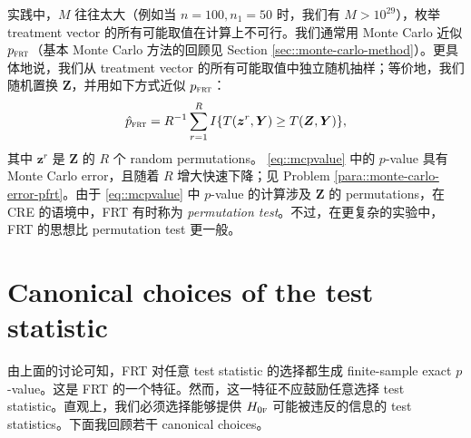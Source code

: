 实践中，$M$ 往往太大（例如当 $n=100, n_1=50$ 时，我们有 $M > 10^{29}$），枚举 treatment vector 的所有可能取值在计算上不可行。我们通常用 Monte Carlo 近似 $p_{\textsc{frt}}$（基本 Monte Carlo 方法的回顾见 Section \ref{sec::monte-carlo-method}）。更具体地说，我们从 treatment vector 的所有可能取值中独立随机抽样；等价地，我们随机置换 $\boldsymbol{Z}$，并用如下方式近似 $p_{\textsc{frt}}$：
\begin{equation}\label{eq::mcpvalue}
\hat p_{\textsc{frt}}  =  R^{-1} \sum_{r=1}^R   I\{ T(\boldsymbol{z}^r,\boldsymbol{Y})   \geq T(\boldsymbol{Z},\boldsymbol{Y})   \},
\end{equation}
其中 $\boldsymbol{z}^r$ 是 $\boldsymbol{Z}$ 的 $R$ 个 random permutations。
\eqref{eq::mcpvalue} 中的 $p$-value 具有 Monte Carlo error，且随着 $R$ 增大快速下降；见 Problem \ref{para::monte-carlo-error-pfrt}。由于 \eqref{eq::mcpvalue} 中 $p$-value 的计算涉及 $\boldsymbol{Z}$ 的 permutations，在 CRE 的语境中，FRT 有时称为 {\it permutation test}。不过，在更复杂的实验中，FRT 的思想比 permutation test 更一般。



\section{Canonical choices of the test statistic}
\label{sec::frt-choiceofstatistic}

由上面的讨论可知，FRT 对任意 test statistic 的选择都生成 finite-sample exact $p$-value。这是 FRT 的一个特征。然而，这一特征不应鼓励任意选择 test statistic。直观上，我们必须选择能够提供 $H_{0\textsc{f}}$ 可能被违反的信息的 test statistics。下面我回顾若干 canonical choices。


